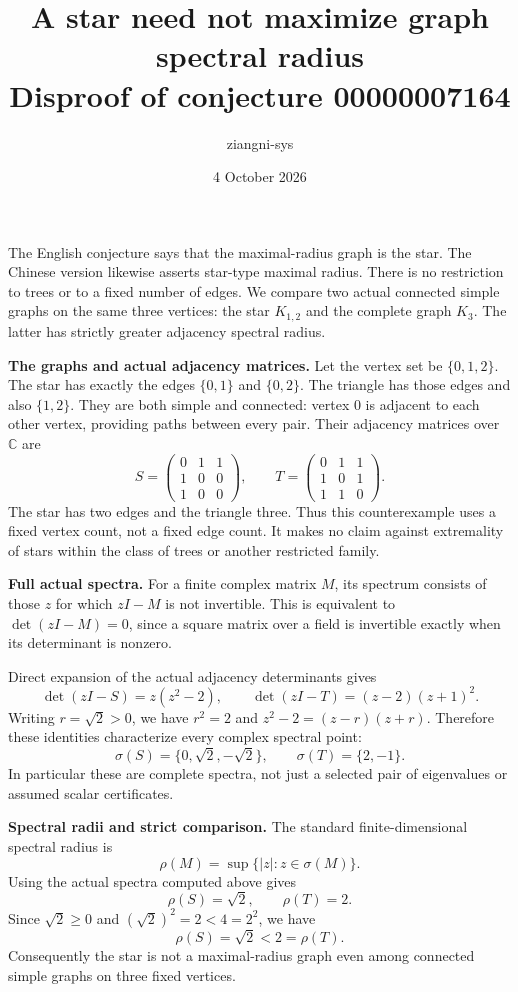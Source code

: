 \documentclass[11pt]{article}
\title{A star need not maximize graph spectral radius\\
\large Disproof of conjecture 00000007164}
\author{ziangni-sys}
\date{4 October 2026}
\begin{document}
\maketitle
The English conjecture says that the maximal-radius graph is the star.
The Chinese version likewise asserts star-type maximal radius.
There is no restriction to trees or to a fixed number of edges.
We compare two actual connected simple graphs on the same three vertices:
the star $K_{1,2}$ and the complete graph $K_3$.
The latter has strictly greater adjacency spectral radius.

\textbf{The graphs and actual adjacency matrices.}
Let the vertex set be $\{0,1,2\}$. The star has exactly the edges
$\{0,1\}$ and $\{0,2\}$. The triangle has those edges and also $\{1,2\}$.
They are both simple and connected: vertex $0$ is adjacent to each
other vertex, providing paths between every pair. Their adjacency matrices
over $\mathbb C$ are
\[
 S=\begin{pmatrix}0&1&1\\1&0&0\\1&0&0\end{pmatrix},
 \qquad
 T=\begin{pmatrix}0&1&1\\1&0&1\\1&1&0\end{pmatrix}.
\]
The star has two edges and the triangle three. Thus this counterexample
uses a fixed vertex count, not a fixed edge count. It makes no claim
against extremality of stars within the class of trees or another
restricted family.

\textbf{Full actual spectra.}
For a finite complex matrix $M$, its spectrum consists of those $z$
for which $zI-M$ is not invertible. This is equivalent to
$\det(zI-M)=0$, since a square matrix over a field is invertible exactly
when its determinant is nonzero.

Direct expansion of the actual adjacency determinants gives
\[
 \det(zI-S)=z(z^2-2),\qquad
 \det(zI-T)=(z-2)(z+1)^2.
\]
Writing $r=\sqrt2>0$, we have $r^2=2$ and
$z^2-2=(z-r)(z+r)$. Therefore these identities characterize every
complex spectral point:
\[
 \sigma(S)=\{0,\sqrt2,-\sqrt2\},\qquad
 \sigma(T)=\{2,-1\}.
\]
In particular these are complete spectra, not just a selected pair of
eigenvalues or assumed scalar certificates.

\newpage
\textbf{Spectral radii and strict comparison.}
The standard finite-dimensional spectral radius is
\[
 \rho(M)=\sup\{|z|:z\in\sigma(M)\}.
\]
Using the actual spectra computed above gives
\[
 \rho(S)=\sqrt2,\qquad \rho(T)=2.
\]
Since $\sqrt2\geq0$ and $(\sqrt2)^2=2<4=2^2$, we have
\[
 \rho(S)=\sqrt2<2=\rho(T).
\]
Consequently the star is not a maximal-radius graph even among
connected simple graphs on three fixed vertices.
\end{document}
